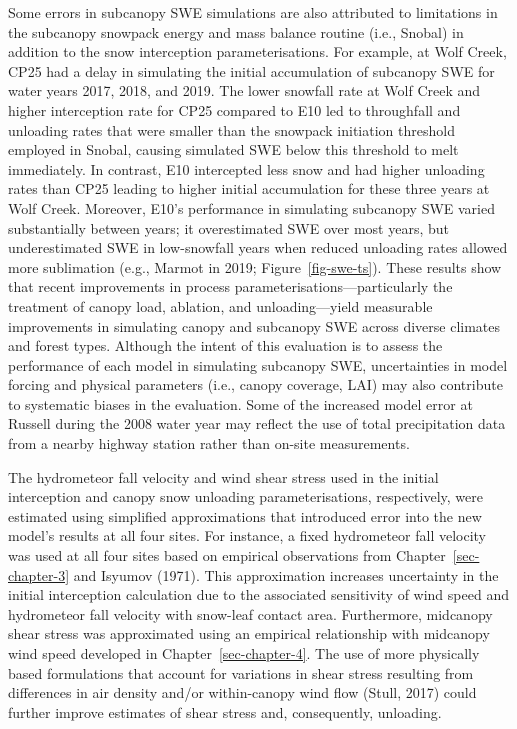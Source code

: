 \documentclass[
  letterpaper,
]{tex/uofsthesis-cs}
\begin{document}
Some errors in subcanopy SWE simulations are also attributed to
limitations in the subcanopy snowpack energy and mass balance routine
(i.e., Snobal) in addition to the snow interception parameterisations.
For example, at Wolf Creek, CP25 had a delay in simulating the initial
accumulation of subcanopy SWE for water years 2017, 2018, and 2019. The
lower snowfall rate at Wolf Creek and higher interception rate for CP25
compared to E10 led to throughfall and unloading rates that were smaller
than the snowpack initiation threshold employed in Snobal, causing
simulated SWE below this threshold to melt immediately. In contrast, E10
intercepted less snow and had higher unloading rates than CP25 leading
to higher initial accumulation for these three years at Wolf Creek.
Moreover, E10's performance in simulating subcanopy SWE varied
substantially between years; it overestimated SWE over most years, but
underestimated SWE in low-snowfall years when reduced unloading rates
allowed more sublimation (e.g., Marmot in 2019;
Figure~\ref{fig-swe-ts}). These results show that recent improvements in
process parameterisations---particularly the treatment of canopy load,
ablation, and unloading---yield measurable improvements in simulating
canopy and subcanopy SWE across diverse climates and forest types.
Although the intent of this evaluation is to assess the performance of
each model in simulating subcanopy SWE, uncertainties in model forcing
and physical parameters (i.e., canopy coverage, LAI) may also contribute
to systematic biases in the evaluation. Some of the increased model
error at Russell during the 2008 water year may reflect the use of total
precipitation data from a nearby highway station rather than on-site
measurements.

The hydrometeor fall velocity and wind shear stress used in the initial
interception and canopy snow unloading parameterisations, respectively,
were estimated using simplified approximations that introduced error
into the new model's results at all four sites. For instance, a fixed
hydrometeor fall velocity was used at all four sites based on empirical
observations from Chapter~\ref{sec-chapter-3} and Isyumov (1971). This
approximation increases uncertainty in the initial interception
calculation due to the associated sensitivity of wind speed and
hydrometeor fall velocity with snow-leaf contact area. Furthermore,
midcanopy shear stress was approximated using an empirical relationship
with midcanopy wind speed developed in Chapter~\ref{sec-chapter-4}. The
use of more physically based formulations that account for variations in
shear stress resulting from differences in air density and/or
within-canopy wind flow (Stull, 2017) could further improve estimates of
shear stress and, consequently, unloading.
\end{document}
